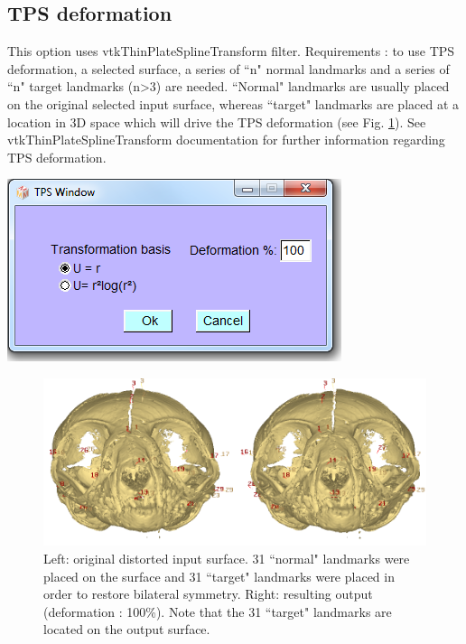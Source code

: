 \subsection{TPS deformation}
\noindent
\begin{minipage}{0.5\textwidth}
This option uses vtkThinPlateSplineTransform filter.
Requirements : to use TPS deformation, a selected surface,
a series of ``n" normal landmarks and a series of ``n"
target landmarks (n>3) are needed. ``Normal" landmarks
are usually placed on the original selected input surface,
whereas ``target" landmarks are placed at a location in 3D
space which will drive the TPS deformation (see Fig. \ref{tps}). See vtkThinPlateSplineTransform documentation for further information regarding TPS deformation.

\end{minipage}    
\begin{minipage}{0.5\textwidth}\centering
  \includegraphics[scale=0.5]{images/Edit_selected_objects/06_tps.png}
 \end{minipage} 
\noindent

\begin{figure}
  \centering
  \includegraphics[scale=0.5]{images/Edit_selected_objects/06_tps_input_output.png} 
	\caption{Left: original distorted input surface. 31 ``normal"
landmarks were placed on the surface and 31
``target" landmarks were placed in order to
restore bilateral symmetry. Right: resulting output (deformation : 100\%). Note
that the 31 ``target" landmarks are located on the output surface.
}
\label{tps}
 
\end{figure}





